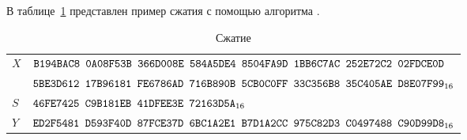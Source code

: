 \label{TEST.Compr}

В таблице~\ref{Table.TEST.Compr} представлен пример сжатия с помощью алгоритма 
. 

\begin{table}[H]
\caption{Сжатие}\label{Table.TEST.Compr}
\begin{tabular}{|l|l|}
\hline
$X$ &
$\texttt{B194BAC8~0A08F53B~366D008E~584A5DE4~8504FA9D~1BB6C7AC~252E72C2~02FDCE0D}$\\
&
$\texttt{5BE3D612~17B96181~FE6786AD~716B890B~5CB0C0FF~33C356B8~35C405AE~D8E07F99}_{16}$\\
\dhline
$S$ & 
$\texttt{46FE7425~C9B181EB~41DFEE3E~72163D5A}_{16}$\\
\hline
$Y$ &
$\texttt{ED2F5481~D593F40D~87FCE37D~6BC1A2E1~B7D1A2CC~975C82D3~C0497488~C90D99D8}_{16}$\\
\hline
\end{tabular}
\end{table}
